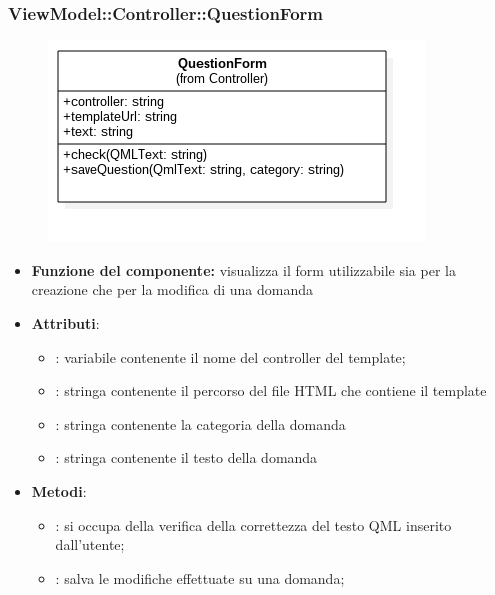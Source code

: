  \subsubsection{ViewModel::Controller::QuestionForm}
 \begin{figure}[h!]
\begin{center}
	\includegraphics[scale=0.6]{../images/ViewModel/Controller/QuestionForm.png}
\end{center}
\end{figure}
 \begin{itemize}
 \item\textbf{Funzione del componente:} visualizza il form utilizzabile sia per la creazione che per la modifica di una domanda
 \item\textbf{Attributi}:
 	\begin{itemize}
 		\item{}: variabile contenente il nome del controller del template;\\
		
		\item{}: stringa contenente il percorso del file HTML che contiene il template\\
		\item{}: stringa contenente la categoria della domanda
		\item{}: stringa contenente il testo della domanda
 	\end{itemize}
 	\item\textbf{Metodi}:
 	\begin{itemize}
 		\item{}: si occupa della verifica della correttezza del testo QML inserito dall'utente;\\
 		\item{}: salva le modifiche effettuate su una domanda;\\
 	\end{itemize}
 \end{itemize}
\newpage
 
